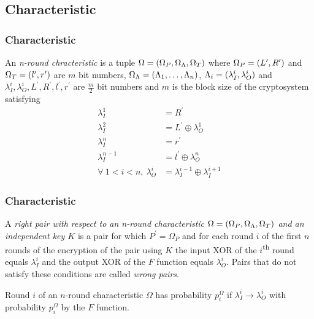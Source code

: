 \documentclass{beamer}
\begin{document}
    \subsection{Characteristic}
    \label{subsec:char}

    \begin{frame}
        \frametitle{Characteristic}
        \begin{definition}[Characteristic]
            An \emph{n-round chracteristic} is a tuple \(\Omega =
            (\Omega_P, \Omega_\Lambda, \Omega_T)\) where \(\Omega_P =
            (L^\prime, R^\prime)\) and \(\Omega_T = (l^\prime,
            r^\prime)\) are \(m\) bit numbers, \(\Omega_\Lambda =
            (\Lambda_1, \ldots, \Lambda_n)\), \(\Lambda_i =
            (\lambda_I^i, \lambda_O^i)\) and \(\lambda_I^i,
            \lambda_O^i, L^\prime, R^\prime, l^\prime, r^\prime\) are
            \(\frac{m}{2}\) bit numbers and \(m\) is the block size of the
            cryptosystem satisfying
            \begin{align}
                \lambda_I^1 &= R^\prime \\
                \lambda_I^2 &= L^\prime \oplus \lambda_O^1 \\
                \lambda_I^n &= r^\prime \\
                \lambda_I^{n-1} &= l^\prime \oplus \lambda_O^n \\
                \forall\ 1 < i < n,\ \lambda_O^i &= \lambda_I^{i-1} \oplus \lambda_I^{i+1}
                \label{eq:char-def}
            \end{align}
        \end{definition}
    \end{frame}

    \begin{frame}
        \frametitle{Characteristic}
        \begin{definition}
            A \emph{right pair with respect to an n-round characteristic
            \(\Omega = (\Omega_P, \Omega_\Lambda, \Omega_T)\) and an
            independent key \(K\)} is a pair for which \(P^\prime = \Omega_P\)
            and for each round \(i\) of the first \(n\) rounds of the encryption
            of the pair using \(K\) the input XOR of the
            \(i\)\textsuperscript{th} round equals \(\lambda_I^i\) and the
            output XOR of the \(F\) function equals \(\lambda_O^i\). Pairs that
            do not satisfy these conditions are called \emph{wrong pairs}.
        \end{definition}
        \pause
        \begin{definition}
            Round \(i\) of an \(n\)-round characteristic \(\Omega\) has
            probability \(p_i^\Omega\) if \(\lambda_I^i \rightarrow
            \lambda_O^i\) with probability \(p_i^\Omega\) by the \(F\) function.
        \end{definition}
    \end{frame}
\end{document}

